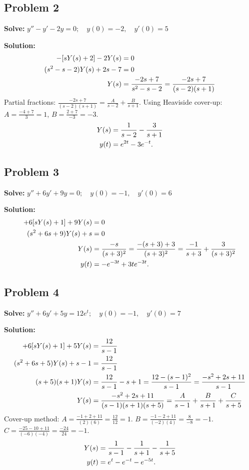 \documentclass[11pt, letterpaper]{article}
\theoremstyle{definition}
\theoremstyle{remark}
\begin{document}
\subsection*{Problem 2}
\textbf{Solve:} $y'' - y' - 2y = 0 ; \quad y(0) = -2 , \quad y'(0) = 5$

\textbf{Solution:}
\begin{align*}
[s^2 Y(s) + 2s - 5] - [s Y(s) + 2] - 2Y(s) &= 0 \\ \relax
(s^2 - s - 2)Y(s) + 2s - 7 &= 0 \\ \relax
Y(s) &= \frac{-2s + 7}{s^2 - s - 2} = \frac{-2s + 7}{(s - 2)(s + 1)}
\end{align*}
Partial fractions: $\frac{-2s + 7}{(s - 2)(s + 1)} = \frac{A}{s - 2} + \frac{B}{s + 1}$.
Using Heaviside cover-up: $A = \frac{-4 + 7}{3} = 1$, $B = \frac{2 + 7}{-3} = -3$.
\begin{align*}
Y(s) &= \frac{1}{s - 2} - \frac{3}{s + 1} \\ \relax
y(t) &= e^{2t} - 3e^{-t}.
\end{align*}

\subsection*{Problem 3}
\textbf{Solve:} $y'' + 6y' + 9y = 0 ; \quad y(0) = -1 , \quad y'(0) = 6$

\textbf{Solution:}
\begin{align*}
[s^2 Y(s) + s - 6] + 6[s Y(s) + 1] + 9Y(s) &= 0 \\ \relax
(s^2 + 6s + 9)Y(s) + s &= 0 \\ \relax
Y(s) &= \frac{-s}{(s + 3)^2} = \frac{-(s + 3) + 3}{(s + 3)^2} = \frac{-1}{s + 3} + \frac{3}{(s + 3)^2} \\ \relax
y(t) &= -e^{-3t} + 3te^{-3t}.
\end{align*}

\subsection*{Problem 4}
\textbf{Solve:} $y'' + 6y' + 5y = 12e^t ; \quad y(0) = -1 , \quad y'(0) = 7$

\textbf{Solution:}
\begin{align*}
[s^2 Y(s) + s - 7] + 6[s Y(s) + 1] + 5Y(s) &= \frac{12}{s - 1} \\ \relax
(s^2 + 6s + 5)Y(s) + s - 1 &= \frac{12}{s - 1} \\ \relax
(s + 5)(s + 1)Y(s) &= \frac{12}{s - 1} - s + 1 = \frac{12 - (s - 1)^2}{s - 1} = \frac{-s^2 + 2s + 11}{s - 1} \\ \relax
Y(s) &= \frac{-s^2 + 2s + 11}{(s - 1)(s + 1)(s + 5)} = \frac{A}{s - 1} + \frac{B}{s + 1} + \frac{C}{s + 5}
\end{align*}
Cover-up method:
$A = \frac{-1 + 2 + 11}{(2)(6)} = \frac{12}{12} = 1$.
$B = \frac{-1 - 2 + 11}{(-2)(4)} = \frac{8}{-8} = -1$.
$C = \frac{-25 - 10 + 11}{(-6)(-4)} = \frac{-24}{24} = -1$.
\begin{align*}
Y(s) &= \frac{1}{s - 1} - \frac{1}{s + 1} - \frac{1}{s + 5} \\ \relax
y(t) &= e^t - e^{-t} - e^{-5t}.
\end{align*}
\end{document}

